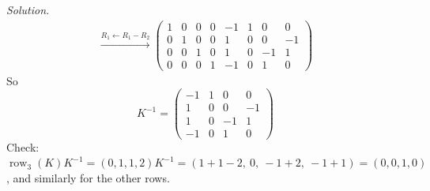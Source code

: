 \documentclass[12pt]{article}
\DeclareMathOperator{\row}{row}
\theoremstyle{definition}
\newenvironment{solution}{\par\noindent\textit{Solution.}\ }{\par\smallskip}
\begin{document}
\begin{solution}
\[\begin{gathered}
\xrightarrow{R_1\leftarrow R_1-R_2}
\left(\begin{array}{cccc|cccc}1&0&0&0&-1&1&0&0\\0&1&0&0&1&0&0&-1\\0&0&1&0&1&0&-1&1\\0&0&0&1&-1&0&1&0\end{array}\right)
\end{gathered}
\]
So
\[
K^{-1}=\begin{pmatrix}-1&1&0&0\\1&0&0&-1\\1&0&-1&1\\-1&0&1&0\end{pmatrix}
\]
Check: \(\row_3(K)K^{-1}=(0,1,1,2)K^{-1}=(1+1-2,\ 0,\ -1+2,\ -1+1)=(0,0,1,0)\), and similarly
for the other rows.
\end{solution}
\end{document}
